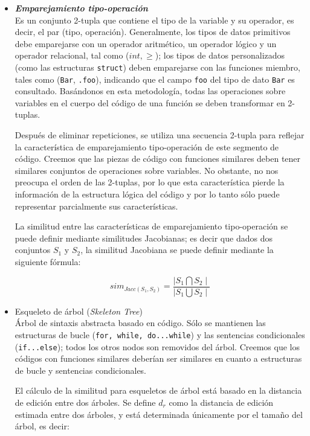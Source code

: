 \begin{itemize}
	\item \textbf{\textit{Emparejamiento tipo-operación}} \\
	Es un conjunto 2-tupla que contiene el tipo de la variable y su operador, es decir, el par (tipo, operación). Generalmente, los tipos de datos primitivos debe emparejarse con un operador aritmético, un operador lógico y un operador relacional, tal como ($int, \geq$); los tipos de datos personalizados (como las estructuras \texttt{struct}) deben emparejarse con las funciones miembro, tales como (\texttt{Bar}, \texttt{.foo}), indicando que el campo \texttt{foo} del tipo de dato \texttt{Bar} es consultado. Basándonos en esta metodología, todas las operaciones sobre variables en el cuerpo del código de una función se deben transformar en 2-tuplas.

	Después de eliminar repeticiones, se utiliza una secuencia 2-tupla para reflejar la característica de emparejamiento tipo-operación de este segmento de código. Creemos que las piezas de código con funciones similares deben tener similares conjuntos de operaciones sobre variables. No obstante, no nos preocupa el orden de las 2-tuplas, por lo que esta característica pierde la información de la estructura lógica del código y por lo tanto sólo puede representar parcialmente sus características.

	La similitud entre las características de emparejamiento tipo-operación se puede definir mediante similitudes Jacobianas; es decir que dados dos conjuntos $S_1$ y $S_2$, la similitud Jacobiana se puede definir mediante la siguiente fórmula:

	\begin{equation}
	sim_{Jacc(S_{1}, S_{2})}=\frac{\mid S_{1}\bigcap S_{2}\mid}{\mid S_{1}\bigcup S_{2}\mid}
	\end{equation}

	\item Esqueleto de árbol (\textit{Skeleton Tree}) \\
	Árbol de sintaxis abstracta basado en código. Sólo se mantienen las estructuras de bucle (\texttt{for, while, do...while}) y las sentencias condicionales (\texttt{if...else}); todos los otros nodos son removidos del árbol. Creemos que los códigos con funciones similares deberían ser similares en cuanto a estructuras de bucle y sentencias condicionales.

	El cálculo de la similitud para esqueletos de árbol está basado en la distancia de edición entre dos árboles. Se define $d_{r}$ como la distancia de edición estimada entre dos árboles, y está determinada únicamente por el tamaño del árbol, es decir:


\end{itemize}
